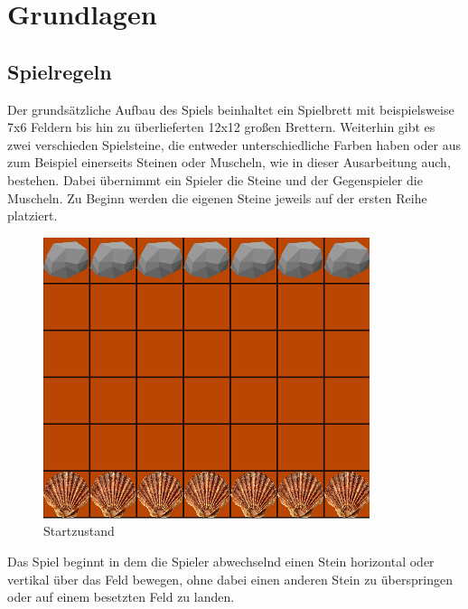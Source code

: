 
\chapter{Grundlagen}
\label{ch:Grundlagen}

\section{Spielregeln}
\label{ch:Grundlagen:sec:Abschnitt1}
Der grundsätzliche Aufbau des Spiels beinhaltet ein Spielbrett mit beispielsweise 7x6 Feldern bis hin zu überlieferten 12x12 großen Brettern. Weiterhin gibt es zwei verschieden Spielsteine, die entweder unterschiedliche Farben haben oder aus zum Beispiel einerseits Steinen oder Muscheln, wie in dieser Ausarbeitung auch, bestehen. Dabei übernimmt ein Spieler die Steine und der Gegenspieler die Muscheln. Zu Beginn werden die eigenen Steine jeweils auf der ersten Reihe  platziert.
\\

\begin{figure}[h]
	\centering
\includegraphics{img/regeln_startzustand}
\caption{Startzustand}
\label{fig:startzustand}
\end{figure}


Das Spiel beginnt in dem die Spieler abwechselnd einen Stein horizontal oder vertikal über das Feld bewegen, ohne dabei einen anderen Stein zu überspringen oder auf einem besetzten Feld zu landen.
\\

